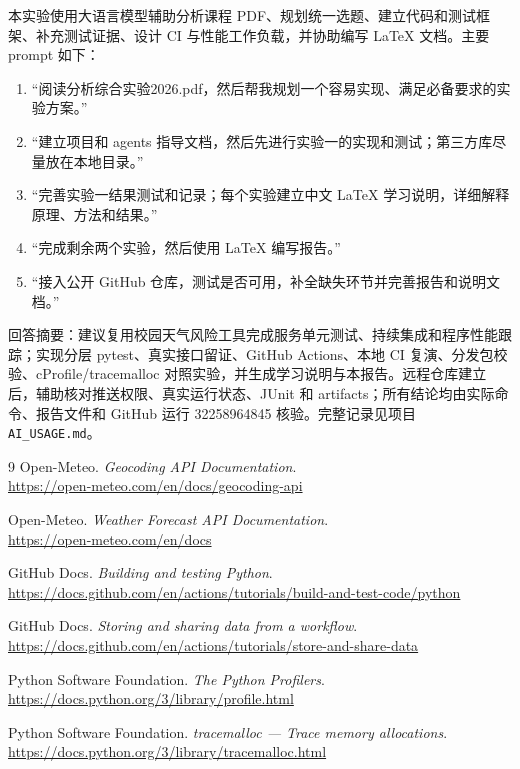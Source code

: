\documentclass[UTF8,zihao=-4,a4paper]{ctexart}
\newcommand{\code}[1]{\texttt{#1}}
\begin{document}
本实验使用大语言模型辅助分析课程 PDF、规划统一选题、建立代码和测试框架、补充测试证据、设计 CI 与性能工作负载，并协助编写 LaTeX 文档。主要 prompt 如下：

\begin{enumerate}
  \item “阅读分析综合实验2026.pdf，然后帮我规划一个容易实现、满足必备要求的实验方案。”
  \item “建立项目和 agents 指导文档，然后先进行实验一的实现和测试；第三方库尽量放在本地目录。”
  \item “完善实验一结果测试和记录；每个实验建立中文 LaTeX 学习说明，详细解释原理、方法和结果。”
  \item “完成剩余两个实验，然后使用 LaTeX 编写报告。”
  \item “接入公开 GitHub 仓库，测试是否可用，补全缺失环节并完善报告和说明文档。”
\end{enumerate}

回答摘要：建议复用校园天气风险工具完成服务单元测试、持续集成和程序性能跟踪；实现分层 pytest、真实接口留证、GitHub Actions、本地 CI 复演、分发包校验、cProfile/tracemalloc 对照实验，并生成学习说明与本报告。远程仓库建立后，辅助核对推送权限、真实运行状态、JUnit 和 artifacts；所有结论均由实际命令、报告文件和 GitHub 运行 32258964845 核验。完整记录见项目 \code{AI\_USAGE.md}。

\begin{thebibliography}{9}
Open-Meteo. \emph{Geocoding API Documentation}.\\
\url{https://open-meteo.com/en/docs/geocoding-api}

Open-Meteo. \emph{Weather Forecast API Documentation}.\\
\url{https://open-meteo.com/en/docs}

GitHub Docs. \emph{Building and testing Python}.\\
\url{https://docs.github.com/en/actions/tutorials/build-and-test-code/python}

GitHub Docs. \emph{Storing and sharing data from a workflow}.\\
\url{https://docs.github.com/en/actions/tutorials/store-and-share-data}

Python Software Foundation. \emph{The Python Profilers}.\\
\url{https://docs.python.org/3/library/profile.html}

Python Software Foundation. \emph{tracemalloc --- Trace memory allocations}.\\
\url{https://docs.python.org/3/library/tracemalloc.html}
\end{thebibliography}
\end{document}
